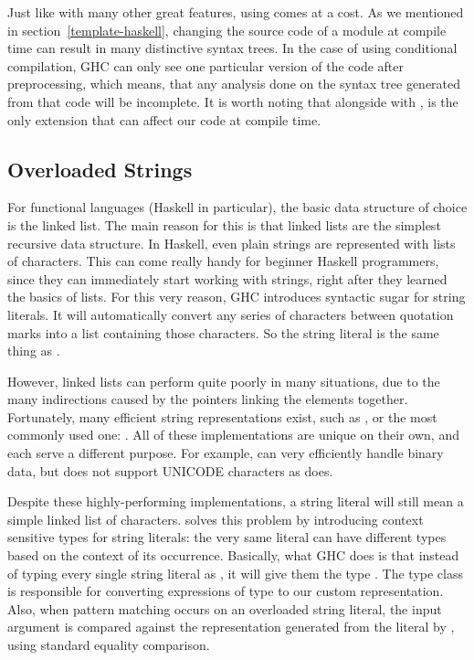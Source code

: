 \documentclass[main.tex]{subfiles}
\begin{document}
	Just like with many other great features, using  comes at a cost. As we mentioned in section~\ref{template-haskell}, changing the source code of a module at compile time can result in many distinctive syntax trees. In the case of using conditional compilation, GHC can only see one particular version of the code after preprocessing, which means, that any analysis done on the syntax tree generated from that code will be incomplete. It is worth noting that alongside with ,  is the only extension that can affect our code at compile time.
	
	\subsection{Overloaded Strings} \label{overloaded-strings}
	
	For functional languages (Haskell in particular), the basic data structure of choice is the linked list. The main reason for this is that linked lists are the simplest recursive data structure. In Haskell, even plain strings are represented with lists of characters. This can come really handy for beginner Haskell programmers, since they can immediately start working with strings, right after they learned the basics of lists. For this very reason, GHC introduces syntactic sugar for string literals. It will automatically convert any series of characters between quotation marks into a list containing those characters. So the  string literal is the same thing as \ilcode{['a','b','c']}.
	
	However, linked lists can perform quite poorly in many situations, due to the many indirections caused by the pointers linking the elements together. Fortunately, many efficient string representations exist, such as ,  or the most commonly used one: . All of these implementations are unique on their own, and each serve a different purpose. For example,  can very efficiently handle binary data, but does not support UNICODE characters as  does.
	
	Despite these highly-performing implementations, a string literal will still mean a simple linked list of characters.  solves this problem by introducing context sensitive types for string literals: the very same literal can have different types based on the context of its occurrence. Basically, what GHC does is that instead of typing every single string literal as \ilcode{[Char]}, it will give them the type . The  type class is responsible for converting expressions of type \ilcode{[Char]} to our custom representation. Also, when pattern matching occurs on an overloaded string literal, the input argument is compared against the representation generated from the literal by , using standard equality comparison.
	
\end{document}
